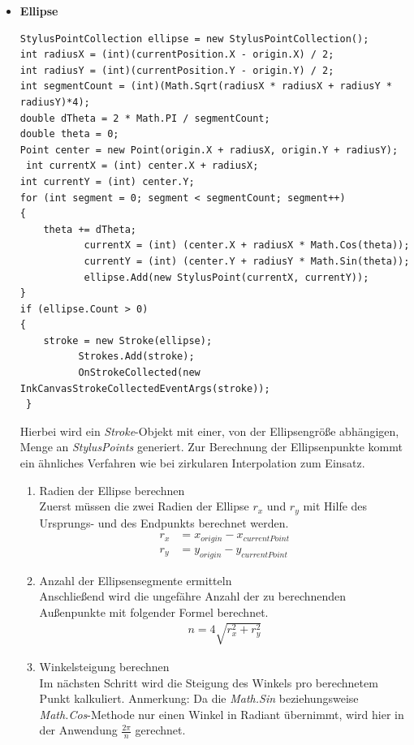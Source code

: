 \begin{itemize}
\item \textbf{Ellipse}
\begin{lstlisting}[language = CSharp, captionpos=b, caption={Ellipse in Strokes konvertieren}]
StylusPointCollection ellipse = new StylusPointCollection();
int radiusX = (int)(currentPosition.X - origin.X) / 2;
int radiusY = (int)(currentPosition.Y - origin.Y) / 2;
int segmentCount = (int)(Math.Sqrt(radiusX * radiusX + radiusY * radiusY)*4);
double dTheta = 2 * Math.PI / segmentCount;
double theta = 0;
Point center = new Point(origin.X + radiusX, origin.Y + radiusY);                        
 int currentX = (int) center.X + radiusX;
int currentY = (int) center.Y;
for (int segment = 0; segment < segmentCount; segment++)
{
	theta += dTheta;
           currentX = (int) (center.X + radiusX * Math.Cos(theta));
           currentY = (int) (center.Y + radiusY * Math.Sin(theta));
           ellipse.Add(new StylusPoint(currentX, currentY));
}
if (ellipse.Count > 0)
{
	stroke = new Stroke(ellipse);
          Strokes.Add(stroke);
          OnStrokeCollected(new InkCanvasStrokeCollectedEventArgs(stroke));
 }
\end{lstlisting}
Hierbei wird ein \textit{Stroke}-Objekt mit einer, von der Ellipsengröße abhängigen, Menge an \textit{StylusPoints} generiert. Zur Berechnung der Ellipsenpunkte kommt ein ähnliches Verfahren wie bei zirkularen Interpolation zum Einsatz.
\begin{enumerate}
\item Radien der Ellipse berechnen\\
Zuerst müssen die zwei Radien der Ellipse $r_x$ und $r_y$ mit Hilfe des Ursprungs- und des Endpunkts berechnet werden.
\begin{align*}
r_x &= x_{origin} - x_{currentPoint}\\
r_y &= y_{origin} - y_{currentPoint}
\end{align*}
\item Anzahl der Ellipsensegmente ermitteln\\
Anschließend wird die ungefähre Anzahl der zu berechnenden Außenpunkte mit folgender Formel berechnet.
\begin{align*}
n = 4 \sqrt{r_x^2+r_y^2}
\end{align*}
\item Winkelsteigung berechnen\\
Im nächsten Schritt wird die Steigung des Winkels pro berechnetem Punkt kalkuliert.
Anmerkung: Da die \textit{Math.Sin} beziehungsweise \textit{Math.Cos}-Methode nur einen Winkel in Radiant übernimmt, wird hier in der Anwendung $\frac{2\pi}{n}$ gerechnet.

\end{enumerate}
\end{itemize}
